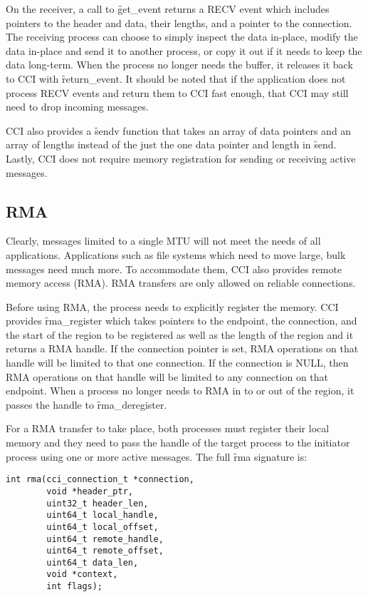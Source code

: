 \documentclass[conference]{IEEEtran}
\begin{document}
On the receiver, a call to \f{get\_event} returns a RECV event which includes pointers to
the header and data, their lengths, and a pointer to the connection. The receiving process
can choose to simply inspect the data in-place, modify the data in-place and send it to
another process, or copy it out if it needs to keep the data long-term. When the process
no longer needs the buffer, it releases it back to CCI with \f{return\_event}. It should
be noted that if the application does not process RECV events and return them to CCI fast
enough, that CCI may still need to drop incoming messages.

CCI also provides a \f{sendv} function that takes an array of data pointers and an array
of lengths instead of the just the one data pointer and length in \f{send}. Lastly, CCI
does not require memory registration for sending or receiving active messages.

\subsection{RMA}
Clearly, messages limited to a single MTU will not meet the needs of all applications.
Applications such as file systems which need to move large, bulk messages need much more.
To accommodate them, CCI also provides remote memory access (RMA). RMA transfers are only
allowed on reliable connections.

Before using RMA, the process needs to explicitly register the memory. CCI provides
\f{rma\_register} which takes pointers to the endpoint, the connection, and the start of
the region to be registered as well as the length of the region and it returns a RMA
handle. If the connection pointer is set, RMA operations on that handle will be limited to
that one connection. If the connection is NULL, then RMA operations on that handle will be
limited to any connection on that endpoint.  When a process no longer needs to RMA in to
or out of the region, it passes the handle to \f{rma\_deregister}.

For a RMA transfer to take place, both processes must register their local memory and they
need to pass the handle of the target process to the initiator process using one or more
active messages. The full \f{rma} signature is:

\begin{verbatim}
int rma(cci_connection_t *connection,
        void *header_ptr,
        uint32_t header_len,
        uint64_t local_handle,
        uint64_t local_offset,
        uint64_t remote_handle,
        uint64_t remote_offset,
        uint64_t data_len,
        void *context,
        int flags);
\end{verbatim}
\end{document}
